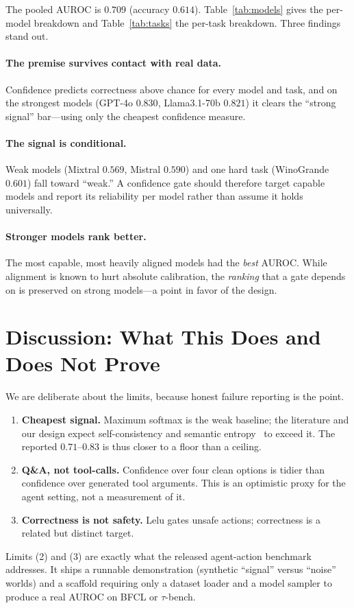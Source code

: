 \documentclass[10pt,twocolumn]{article}
\begin{document}
The pooled AUROC is $\mathbf{0.709}$ (accuracy $0.614$). Table~\ref{tab:models}
gives the per-model breakdown and Table~\ref{tab:tasks} the per-task breakdown.
Three findings stand out.

\paragraph{The premise survives contact with real data.}
Confidence predicts correctness above chance for every model and task, and on the
strongest models (GPT-4o $0.830$, Llama3.1-70b $0.821$) it clears the ``strong
signal'' bar---using only the cheapest confidence measure.

\paragraph{The signal is conditional.}
Weak models (Mixtral $0.569$, Mistral $0.590$) and one hard task
(WinoGrande $0.601$) fall toward ``weak.'' A confidence gate should therefore
target capable models and report its reliability per model rather than assume it
holds universally.

\paragraph{Stronger models rank better.}
The most capable, most heavily aligned models had the \emph{best} AUROC. While
alignment is known to hurt absolute calibration, the \emph{ranking} that a gate
depends on is preserved on strong models---a point in favor of the design.

\section{Discussion: What This Does and Does Not Prove}
We are deliberate about the limits, because honest failure reporting is the point.
\begin{enumerate}
\item \textbf{Cheapest signal.} Maximum softmax is the weak baseline; the
literature and our design expect self-consistency and semantic
entropy~\cite{wang2022self,farquhar2024detecting} to exceed it. The reported
$0.71$--$0.83$ is thus closer to a floor than a ceiling.
\item \textbf{Q\&A, not tool-calls.} Confidence over four clean options is tidier
than confidence over generated tool arguments. This is an optimistic proxy for the
agent setting, not a measurement of it.
\item \textbf{Correctness is not safety.} Lelu gates unsafe actions; correctness
is a related but distinct target.
\end{enumerate}
Limits (2) and (3) are exactly what the released agent-action benchmark
addresses. It ships a runnable demonstration (synthetic ``signal'' versus
``noise'' worlds) and a scaffold requiring only a dataset loader and a model
sampler to produce a real AUROC on BFCL or $\tau$-bench.
\end{document}

